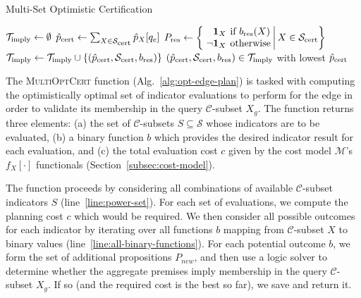 \begin{algorithm}
\caption{Multi-Set Optimistic Certification}
\label{alg:opt-edge-plan}
\begin{algorithmic}[1]
   \State $\mathcal{T}_{\mbox{\scriptsize imply}} \leftarrow \emptyset$
         \label{line:power-set}
      \State ${\hat p}_{\mbox{\scriptsize cert}} \leftarrow \sum_{X \in \mathcal{S}_{\mbox{\scriptsize cert}}} \hat{p}_X[q_e]$
            \label{line:all-binary-functions}
         \State $\arraycolsep=2pt
            P_{\ms{res}} \leftarrow
            \left\{\left. \begin{array}{rl}
            \mathbf{1}_X & \mbox{if } b_{\ms{res}}(X) \\
            \lnot \mathbf{1}_X & \mbox{otherwise} \\
            \end{array}
            \right|
            X \in \mathcal{S}_{\ms{cert}}
            \right\}$
            \State $\mathcal{T}_{\mbox{\scriptsize imply}} \leftarrow
               \mathcal{T}_{\mbox{\scriptsize imply}} \cup
               \{ ({\hat p}_{\mbox{\scriptsize cert}}, \mathcal{S}_{\mbox{\scriptsize cert}}, b_{\mbox{\scriptsize res}}) \}$
         \EndIf
      \EndFor
   \EndFor
   \State \Return $({\hat p}_{\mbox{\scriptsize cert}}, \mathcal{S}_{\mbox{\scriptsize cert}}, b_{\mbox{\scriptsize res}})
      \in \mathcal{T}_{\mbox{\scriptsize imply}}$
      with lowest ${\hat p}_{\mbox{\scriptsize cert}}$
\EndFunction
\end{algorithmic}
\end{algorithm}

The \textsc{MultiOptCert} function (Alg.~\ref{alg:opt-edge-plan})
is tasked with computing
the optimistically optimal set of indicator evaluations to perform
for the edge in order to validate its membership in the query
$\mathcal{C}$-subset $X_g$.
The function returns three elements:
(a) the set of $\mathcal{C}$-subsets $S \subseteq \mathcal{S}$
whose indicators are to be evaluated,
(b) a binary function $b$
which provides the desired indicator result for each evaluation,
and (c) the total evaluation cost $c$
given by the cost model $\mathcal{M}$'s $f_X[\cdot]$ functionals
(Section~\ref{subsec:cost-model}).

The function proceeds by considering all combinations of
available $\mathcal{C}$-subset indicators $S$ (line~\ref{line:power-set}).
For each set of evaluations,
we compute the planning cost $c$ which would be required.
We then consider all possible outcomes for each indicator
by iterating over all functions $b$ mapping
from $\mathcal{C}$-subset $X$ to binary values
(line~\ref{line:all-binary-functions}).
For each potential outcome $b$,
we form the set of additional propositions $P_{new}$,
and then use a logic solver to determine whether the aggregate
premises imply membership in the query $\mathcal{C}$-subset $X_g$.
If so (and the required cost is the best so far),
we save and return it.

